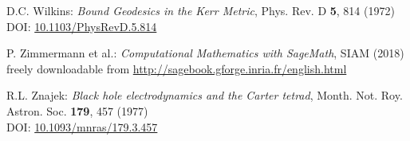 \begin{thebibliography}{123}
D.C. Wilkins:
{\em Bound Geodesics in the Kerr Metric},
Phys. Rev. D {\bf 5}, 814 (1972)\\
DOI: \href{https://doi.org/10.1103/PhysRevD.5.814}{10.1103/PhysRevD.5.814}


P. Zimmermann et al.: {\em Computational Mathematics with SageMath}, SIAM (2018) \\
freely downloadable from \url{http://sagebook.gforge.inria.fr/english.html}

R.L. Znajek:
{\em Black hole electrodynamics and the Carter tetrad},
Month. Not. Roy. Astron. Soc. {\bf 179}, 457 (1977)\\
DOI: \href{https://doi.org/10.1093/mnras/179.3.457}{10.1093/mnras/179.3.457}

\end{thebibliography}
